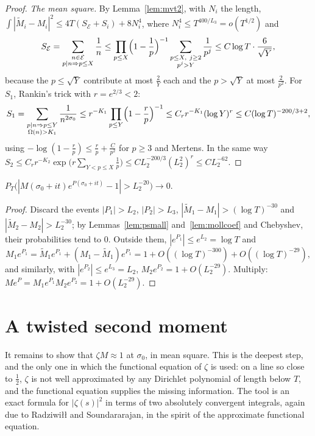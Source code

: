 \begin{proof}
\emph{The mean square.} By Lemma~\ref{lem:mvt2}, with $N_i$ the length, $\int|\widetilde M_i-M_i|^2\le4T(S_{\mathcal E}+S_i)+8N_i^4$, where $N_i^4\le T^{400/L_3}=o(T^{1/2})$ and
\[
S_{\mathcal E}=\sum_{\substack{n\in\mathcal E\\p\mid n\Rightarrow p\le X}}\frac1n\le\prod_{p\le X}\Bigl(1-\frac1p\Bigr)^{-1}\sum_{\substack{p\le X,\ j\ge2\\p^j>Y}}\frac1{p^j}\le C\log T\cdot\frac6{\sqrt Y},
\]
because the $p\le\sqrt Y$ contribute at most $\frac2Y$ each and the $p>\sqrt Y$ at most $\frac2{p^2}$. For $S_1$, Rankin's trick with $r=e^{2/3}<2$:
\[
S_1=\sum_{\substack{p\mid n\Rightarrow p\le Y\\\Omega(n)>K_1}}\frac1{n^{2\sigma_0}}\le r^{-K_1}\prod_{p\le Y}\Bigl(1-\frac r{p}\Bigr)^{-1}\le C_rr^{-K_1}(\log Y)^r\le C(\log T)^{-200/3+2},
\]
using $-\log(1-\frac rp)\le\frac rp+\frac{C}{p^2}$ for $p\ge3$ and Mertens. In the same way $S_2\le C_rr^{-K_2}\exp\bigl(r\sum_{Y<p\le X}\frac1p\bigr)\le CL_2^{-200/3}(L_2^2)^r\le CL_2^{-62}$.
\end{proof}

\begin{proposition}\label{prop:mollifier}
$P_T\bigl(|M(\sigma_0+it)e^{P(\sigma_0+it)}-1|>L_2^{-20}\bigr)\to0$.
\end{proposition}
\begin{proof}
Discard the events $|P_1|>L_2$, $|P_2|>L_3$, $|\widetilde M_1-M_1|>(\log T)^{-30}$ and $|\widetilde M_2-M_2|>L_2^{-30}$; by Lemmas~\ref{lem:psmall} and~\ref{lem:mollcoef} and Chebyshev, their probabilities tend to $0$. Outside them, $|e^{P_1}|\le e^{L_2}=\log T$ and
\[
M_1e^{P_1}=\widetilde M_1e^{P_1}+(M_1-\widetilde M_1)e^{P_1}=1+O((\log T)^{-300})+O((\log T)^{-29}),
\]
and similarly, with $|e^{P_2}|\le e^{L_3}=L_2$, $M_2e^{P_2}=1+O(L_2^{-29})$. Multiply: $Me^P=M_1e^{P_1}M_2e^{P_2}=1+O(L_2^{-29})$.
\end{proof}

\section{A twisted second moment}

It remains to show that $\zeta M\approx1$ at $\sigma_0$, in mean square. This is the deepest step, and the only one in which the functional equation of $\zeta$ is used: on a line so close to $\frac12$, $\zeta$ is not well approximated by any Dirichlet polynomial of length below $T$, and the functional equation supplies the missing information. The tool is an exact formula for $|\zeta(s)|^2$ in terms of two absolutely convergent integrals, again due to Radziwi\l\l{} and Soundararajan, in the spirit of the approximate functional equation.

